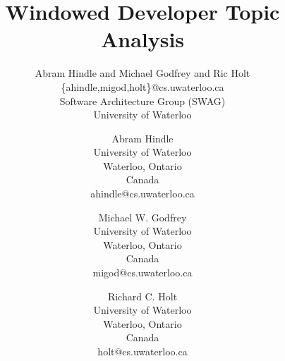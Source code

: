 \documentclass[times, 10pt,twocolumn]{article}
\author{Abram Hindle and Michael Godfrey and Ric Holt \\
\{ahindle,migod,holt\}@cs.uwaterloo.ca\\
Software Architecture Group (SWAG)\\
University of Waterloo\\
}
\title{Windowed Developer Topic Analysis}
\begin{document}
\newcommand{\affaddr}[1]{#1}
\newcommand{\aemail}[1]{#1}
\author{
Abram Hindle\\
\affaddr{University of Waterloo}\\
\affaddr{Waterloo, Ontario}\\
\affaddr{Canada}\\
\aemail{ahindle@cs.uwaterloo.ca}
\and
Michael W. Godfrey\\
\affaddr{University of Waterloo}\\
\affaddr{Waterloo, Ontario}\\
\affaddr{Canada}\\
\aemail{migod@cs.uwaterloo.ca}
\and
Richard C. Holt\\
\affaddr{University of Waterloo}\\
\affaddr{Waterloo, Ontario}\\
\affaddr{Canada}\\
\aemail{holt@cs.uwaterloo.ca}
}
\end{document}
